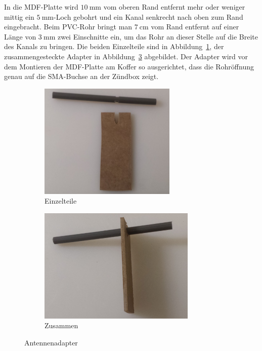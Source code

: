 \documentclass[paper=a4, parskip, numbers=noenddot, toc=listof, headsepline]{scrbook}
\begin{document}
						In die MDF-Platte wird $\SI{10}{\milli\metre}$ vom oberen Rand entfernt mehr oder weniger mittig ein $\SI{5}{\milli\metre}$-Loch gebohrt und ein Kanal senkrecht nach oben zum Rand eingebracht. Beim PVC-Rohr bringt man $\SI{7}{\centi\metre}$ vom Rand entfernt auf einer Länge von $\SI{3}{\milli\metre}$ zwei Einschnitte ein, um das Rohr an dieser Stelle auf die Breite des Kanals zu bringen. Die beiden Einzelteile sind in Abbildung~\ref{fig:koffer-adapter-einzeln}, der zusammengesteckte Adapter in Abbildung~\ref{fig:koffer-adapter-zusammen} abgebildet. Der Adapter wird vor dem Montieren der MDF-Platte am Koffer so ausgerichtet, dass die Rohröffnung genau auf die SMA-Buchse an der Zündbox zeigt.

						\begin{figure}
							\begin{subfigure}[t]{0.5\textwidth}
								\includegraphics[height=55mm]{Bilder/koffer-adapter-einzeln}
								\caption{Einzelteile}
								\label{fig:koffer-adapter-einzeln}
							\end{subfigure}
							\hfill%
							\begin{subfigure}[t]{0.5\textwidth}
								\includegraphics[height=55mm]{Bilder/koffer-adapter-zusammen}
								\caption{Zusammen}
								\label{fig:koffer-adapter-zusammen}
							\end{subfigure}
							\caption{Antennenadapter}
						\end{figure}
\end{document}
